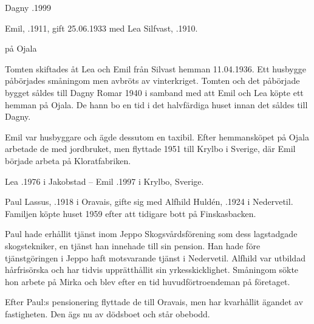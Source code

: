 Dagny .1999


Emil, .1911, gift 25.06.1933 med Lea Silfvast, .1910.
\begin{jhchildren}
  \item {}
  \item {}
  \item {} på Ojala
\end{jhchildren}

Tomten skiftades åt Lea och Emil från Silvast hemman 11.04.1936. Ett husbygge påbörjades småningom men avbröts av vinterkriget. Tomten och det påbörjade bygget såldes till Dagny Romar 1940 i samband med att Emil och Lea köpte ett hemman på Ojala. De hann bo en tid i det halvfärdiga huset innan det såldes till Dagny.

Emil var husbyggare och ägde dessutom en taxibil. Efter hemmansköpet på Ojala arbetade de med jordbruket, men flyttade 1951 till Krylbo i Sverige, där Emil började arbeta på Kloratfabriken.

Lea .1976 i Jakobstad  --  Emil .1997 i Krylbo, Sverige.



Paul Lassus, .1918 i Oravais, gifte sig med Alfhild Huldén, .1924 i Nedervetil. Familjen köpte huset 1959 efter att tidigare bott på Finskasbacken.



Paul hade erhållit tjänst inom Jeppo Skogsvårdsförening som dess lagstadgade skogstekniker, en tjänst han innehade till sin pension. Han hade före tjänstgöringen i Jeppo haft motsvarande tjänst i Nedervetil. Alfhild var utbildad hårfrisörska och har tidvis upprätthållit sin yrkesskicklighet. Småningom sökte hon arbete på Mirka och blev efter en tid huvudförtroendeman på företaget.

Efter Paul:s pensionering flyttade de till Oravais, men har kvarhållit ägandet av fastigheten. Den ägs nu av dödsboet och står obebodd.
\begin{jhchildren}
  \item {}
  \item {}
  \item {}
  \item {}
\end{jhchildren}


